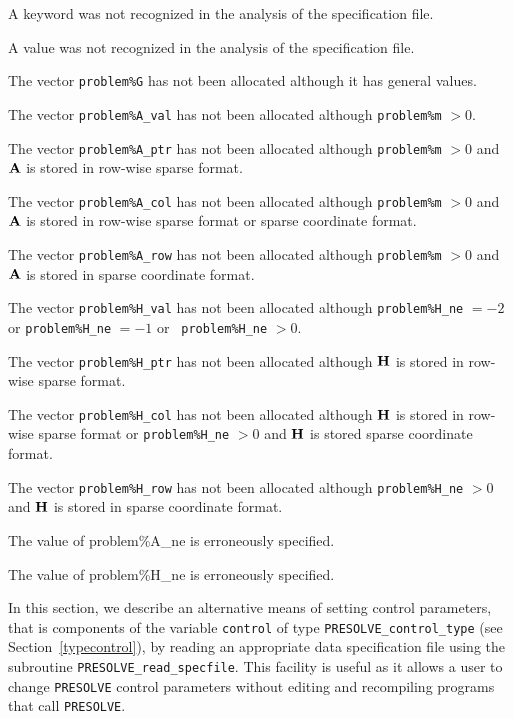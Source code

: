 \documentclass{galahad}
\newcommand{\packagename}{PRESOLVE}
\begin{document}
\begin{description}
 A keyword was not recognized in the analysis of the specification
file. 

 A value was not recognized in the analysis of the specification file.

 The vector {\tt problem\%G} has not been allocated although it
has general values.

 The vector {\tt problem\%A\_val} has not been allocated although
{\tt problem\%m} $> 0$.

 The vector {\tt problem\%A\_ptr} has not been allocated although
{\tt problem\%m} $> 0$ and ${\mathbf{A}}$ is stored in row-wise sparse format.

 The vector {\tt problem\%A\_col} has not been allocated although
{\tt problem\%m} $> 0$ and ${\mathbf{A}}$ is stored in row-wise sparse format
or sparse coordinate format.

 The vector {\tt problem\%A\_row} has not been allocated although
{\tt problem\%m} $> 0$ and ${\mathbf{A}}$ is stored in sparse coordinate format.

 The vector {\tt problem\%H\_val} has not been allocated although
{\tt problem\%H\_ne} $= -2$ or {\tt problem\%H\_ne} $= -1$ or {\tt
problem\%H\_ne} $> 0$.

 The vector {\tt problem\%H\_ptr} has not been allocated although
${\mathbf{H}}$ is stored in row-wise sparse format.

 The vector {\tt problem\%H\_col} has not been allocated although
${\mathbf{H}}$ is stored in row-wise sparse format or {\tt problem\%H\_ne} $> 0$ and
${\mathbf{H}}$ is stored sparse coordinate format. 

 The vector {\tt problem\%H\_row} has not been allocated although
{\tt problem\%H\_ne} $> 0$ and ${\mathbf{H}}$ is stored in sparse coordinate format.

 The value of problem\%A\_ne is erroneously specified.

 The value of problem\%H\_ne is erroneously specified.

\end{description}


\galfeatures
\noindent In this section, we describe an alternative means of setting 
control parameters, that is components of the variable {\tt control} of type
{\tt \packagename\_control\_type}
(see Section~\ref{typecontrol}), 
by reading an appropriate data specification file using the
subroutine {\tt \packagename\_read\_specfile}. This facility
is useful as it allows a user to change  {\tt \packagename} control parameters 
without editing and recompiling programs that call {\tt \packagename}.
\end{document}
